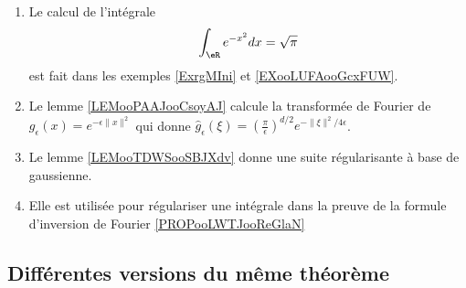 \begin{enumerate}
    \item
        Le calcul de l'intégrale
        \begin{equation}
            \int_{\eR} e^{-x^2}dx=\sqrt{\pi }
        \end{equation}
        est fait dans les exemples \ref{ExrgMIni} et \ref{EXooLUFAooGcxFUW}.
    \item
        Le lemme \ref{LEMooPAAJooCsoyAJ} calcule la transformée de Fourier de $ g_{\epsilon}(x)=  e^{-\epsilon\| x \|^2}$ qui donne $\hat g_{\epsilon}(\xi)=\left( \frac{ \pi }{ \epsilon } \right)^{d/2} e^{-\| \xi \|^2/4\epsilon}$.
    \item
        Le lemme \ref{LEMooTDWSooSBJXdv} donne une suite régularisante à base de gaussienne.
    \item
        Elle est utilisée pour régulariser une intégrale dans la preuve de la formule d'inversion de Fourier \ref{PROPooLWTJooReGlaN}
\end{enumerate}

\subsection*{Différentes versions du même théorème}

